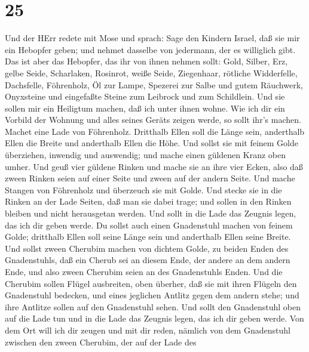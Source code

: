 \hypertarget{section-24}{%
\section{25}\label{section-24}}

 Und der HErr redete mit Mose und sprach:  Sage
den Kindern Israel, daß sie mir ein Hebopfer geben; und nehmet dasselbe
von jedermann, der es williglich gibt.  Das ist aber das
Hebopfer, das ihr von ihnen nehmen sollt: Gold, Silber, Erz,
 gelbe Seide, Scharlaken, Rosinrot, weiße Seide, Ziegenhaar,
 rötliche Widderfelle, Dachsfelle, Föhrenholz, 
Öl zur Lampe, Spezerei zur Salbe und gutem Räuchwerk, 
Onyxsteine und eingefaßte Steine zum Leibrock und zum Schildlein.
 Und sie sollen mir ein Heiligtum machen, daß ich unter
ihnen wohne.  Wie ich dir ein Vorbild der Wohnung und alles
seines Geräts zeigen werde, so sollt ihr's machen.  Machet
eine Lade von Föhrenholz. Dritthalb Ellen soll die Länge sein,
anderthalb Ellen die Breite und anderthalb Ellen die Höhe. 
Und sollst sie mit feinem Golde überziehen, inwendig und auswendig; und
mache einen güldenen Kranz oben umher.  Und geuß vier
güldene Rinken und mache sie an ihre vier Ecken, also daß zween Rinken
seien auf einer Seite und zween auf der andern Seite.  Und
mache Stangen von Föhrenholz und überzeuch sie mit Golde. 
Und stecke sie in die Rinken an der Lade Seiten, daß man sie dabei
trage;  und sollen in den Rinken bleiben und nicht
herausgetan werden.  Und sollt in die Lade das Zeugnis
legen, das ich dir geben werde.  Du sollst auch einen
Gnadenstuhl machen von feinem Golde; dritthalb Ellen soll seine Länge
sein und anderthalb Ellen seine Breite.  Und sollst zween
Cherubim machen von dichtem Golde, zu beiden Enden des Gnadenstuhls,
 daß ein Cherub sei an diesem Ende, der andere an dem
andern Ende, und also zween Cherubim seien an des Gnadenstuhls Enden.
 Und die Cherubim sollen Flügel ausbreiten, oben überher,
daß sie mit ihren Flügeln den Gnadenstuhl bedecken, und eines jeglichen
Antlitz gegen dem andern stehe; und ihre Antlitze sollen auf den
Gnadenstuhl sehen.  Und sollt den Gnadenstuhl oben auf die
Lade tun und in die Lade das Zeugnis legen, das ich dir geben werde.
 Von dem Ort will ich dir zeugen und mit dir reden, nämlich
von dem Gnadenstuhl zwischen den zween Cherubim, der auf der Lade des
